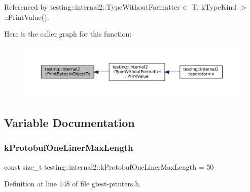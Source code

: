 Referenced by testing\+::internal2\+::\+Type\+Without\+Formatter$<$ T, k\+Type\+Kind $>$\+::\+Print\+Value().

Here is the caller graph for this function\+:
\nopagebreak
\begin{figure}[H]
\begin{center}
\leavevmode
\includegraphics[width=350pt]{namespacetesting_1_1internal2_a9fbf8e07c0f94dc74d6ef5e56cd3c553_icgraph}
\end{center}
\end{figure}


\subsection{Variable Documentation}
\mbox{\label{namespacetesting_1_1internal2_a140c8efd51e63a3def98445bff107518}} 
\subsubsection{\texorpdfstring{k\+Protobuf\+One\+Liner\+Max\+Length}{kProtobufOneLinerMaxLength}}
{\footnotesize\ttfamily const size\+\_\+t testing\+::internal2\+::k\+Protobuf\+One\+Liner\+Max\+Length = 50}



Definition at line 148 of file gtest-\/printers.\+h.

